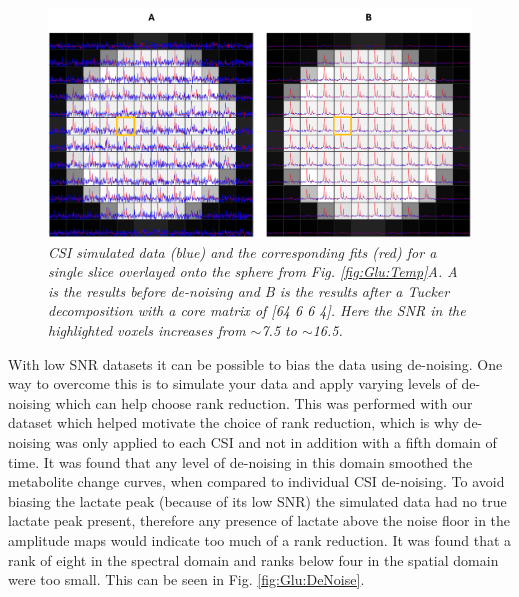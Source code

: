 \begin{figure}
   \centering
   \includegraphics[width = 1\textwidth]{Figures/Glucose/DeNoise_Spectra.png}
   \caption{\textit{\ac{CSI} simulated data (blue) and the corresponding fits (red) for a single slice overlayed onto the sphere from Fig. \ref{fig:Glu:Temp}A. A is the results before de-noising and B is the results after a Tucker decomposition with a core matrix of [64 6 6 4]. Here the \ac{SNR} in the highlighted voxels increases from $\sim$7.5 to $\sim$16.5.}}
   \label{fig:Glu:DeNoise_spectra}
\end{figure}

With low \ac{SNR} datasets it can be possible to bias the data using de-noising. One way to overcome this is to simulate your data and apply varying levels of de-noising which can help choose rank reduction. This was performed with our dataset which helped motivate the choice of rank reduction, which is why de-noising was only applied to each \ac{CSI} and not in addition with a fifth domain of time. It was found that any level of de-noising in this domain smoothed the metabolite change curves, when compared to individual \ac{CSI} de-noising. To avoid biasing the lactate peak (because of its low \ac{SNR}) the simulated data had no true lactate peak present, therefore any presence of lactate above the noise floor in the amplitude maps would indicate too much of a rank reduction. It was found that a rank of eight in the spectral domain and ranks below four in the spatial domain were too small. This can be seen in Fig. \ref{fig:Glu:DeNoise}.

